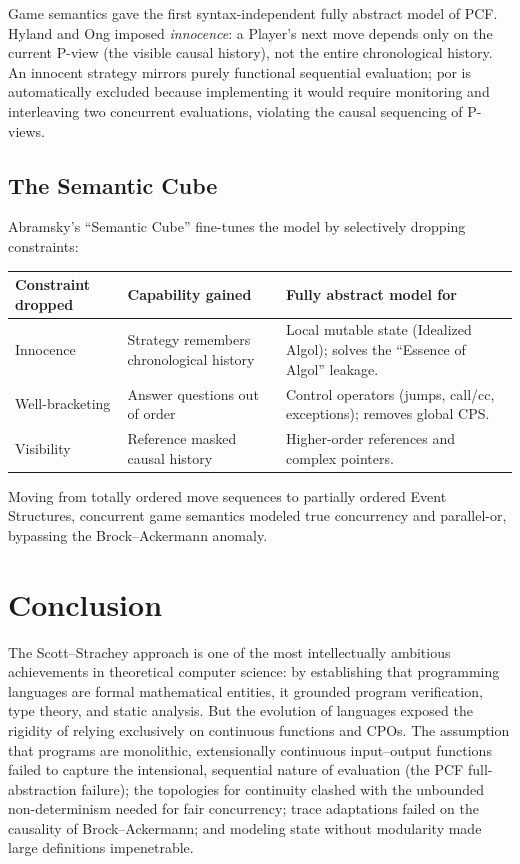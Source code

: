 \documentclass[11pt]{article}
\begin{document}
Game semantics gave the first syntax-independent fully abstract model of PCF. Hyland and Ong
imposed \emph{innocence}: a Player's next move depends only on the current P-view (the visible
causal history), not the entire chronological history. An innocent strategy mirrors purely
functional sequential evaluation; $\mathrm{por}$ is automatically excluded because implementing
it would require monitoring and interleaving two concurrent evaluations, violating the causal
sequencing of P-views.

\subsection{The Semantic Cube}

Abramsky's ``Semantic Cube'' fine-tunes the model by selectively dropping constraints:

\begin{center}\small
\begin{tabular}{@{}p{3.0cm}p{5.0cm}p{4.6cm}@{}}
\toprule
Constraint dropped & Capability gained & Fully abstract model for \\
\midrule
Innocence & Strategy remembers chronological history & Local mutable state (Idealized Algol); solves the ``Essence of Algol'' leakage. \\
Well-bracketing & Answer questions out of order & Control operators (jumps, call/cc, exceptions); removes global CPS. \\
Visibility & Reference masked causal history & Higher-order references and complex pointers. \\
\bottomrule
\end{tabular}
\end{center}

Moving from totally ordered move sequences to partially ordered Event Structures,
concurrent game semantics modeled true concurrency and parallel-or, bypassing the
Brock--Ackermann anomaly.

\section{Conclusion}

The Scott--Strachey approach is one of the most intellectually ambitious achievements in
theoretical computer science: by establishing that programming languages are formal
mathematical entities, it grounded program verification, type theory, and static analysis.
But the evolution of languages exposed the rigidity of relying exclusively on continuous
functions and CPOs. The assumption that programs are monolithic, extensionally continuous
input--output functions failed to capture the intensional, sequential nature of evaluation
(the PCF full-abstraction failure); the topologies for continuity clashed with the unbounded
non-determinism needed for fair concurrency; trace adaptations failed on the causality of
Brock--Ackermann; and modeling state without modularity made large definitions impenetrable.
\end{document}
